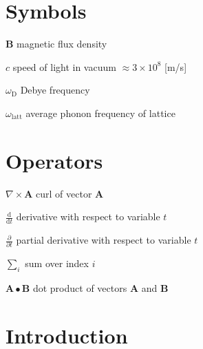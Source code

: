 \documentclass[12pt, a4paper, oneside]{article}
\begin{document}
\section*{Symbols}

\begin{abbreviations}
    \item [$\mathbf{B}$]                magnetic flux density
    \item [$c$]                         speed of light in vacuum $\approx 3\times10^8$ [m/s]
    \item [$\omega_{\mathrm{D}}$]       Debye frequency
    \item [$\omega_{\mathrm{latt}}$]    average phonon frequency of lattice
\end{abbreviations}

\section*{Operators}

\begin{abbreviations}[style=multiline,leftmargin=3cm,font=\normalfont,itemsep=0pt,parsep=0.6\baselineskip,labelindent=5mm]
    \item [$\nabla \times \mathbf{A}$]                      curl of vector $\mathbf{A}$
    \item [$\displaystyle\frac{\mbox{d}}{\mbox{d} t}$]      derivative with respect to variable $t$
    \item [$\displaystyle\frac{\partial}{\partial t}$]      partial derivative with respect to variable $t$
    \item [$\sum_i $]                                       sum over index $i$
    \item [$\mathbf{A} \bullet \mathbf{B}$]                 dot product of vectors $\mathbf{A}$ and $\mathbf{B}$
\end{abbreviations}

\cleardoublepage


\setcounter{page}{1}
\onehalfspacing

\section{Introduction} \label{sec:intro}
\end{document}
